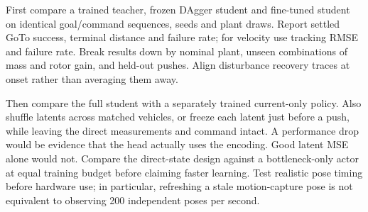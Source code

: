 \documentclass[10pt,a4paper,twocolumn]{article}
\begin{document}
First compare a trained teacher, frozen DAgger student and fine-tuned student on identical goal/command sequences, seeds and plant draws. Report settled GoTo success, terminal distance and failure rate; for velocity use tracking RMSE and failure rate. Break results down by nominal plant, unseen combinations of mass and rotor gain, and held-out pushes. Align disturbance recovery traces at onset rather than averaging them away.

Then compare the full student with a separately trained current-only policy. Also shuffle latents across matched vehicles, or freeze each latent just before a push, while leaving the direct measurements and command intact. A performance drop would be evidence that the head actually uses the encoding. Good latent MSE alone would not. Compare the direct-state design against a bottleneck-only actor at equal training budget before claiming faster learning. Test realistic pose timing before hardware use; in particular, refreshing a stale motion-capture pose is not equivalent to observing 200 independent poses per second.
\end{document}
